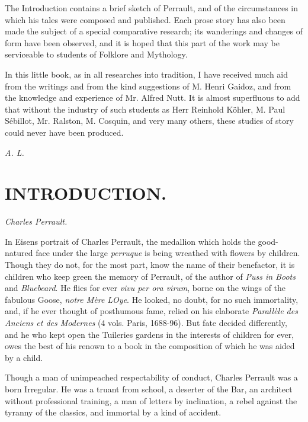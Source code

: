 \documentclass[14pt,a4paper]{memoir}
\begin{document}
The Introduction contains a brief sketch of Perrault, and
of the circumstances in which his tales were composed and published.
Each prose story has also been made the subject of a special comparative
research; its wanderings and changes of form have been observed, and it
is hoped that this part of the work may be serviceable to students of Folklore and Mythology.

In this little book, as in all researches into tradition, I have
received much aid from the writings and from the kind suggestions of M.
Henri Gaidoz, and from the knowledge and experience of Mr. Alfred
Nutt. It is almost superfluous to add that without the industry of
such students as Herr Reinhold Köhler, M. Paul Sébillot, Mr. Ralston,
M. Cosquin, and very many others, these studies of story could
never have been produced. \\

\begin{flushright}
\itshape A. L.
\end{flushright}


\chapter{INTRODUCTION.}

\begin{flushright}
\large \itshape Charles Perrault.
\end{flushright}

In Eisen\textquotesingle s portrait of Charles Perrault, the medallion
which holds the good-natured face under the large \emph{perruque} is
being wreathed with flowers by children. Though they do not, for the
most part, know the name of their benefactor, it is children who keep
green the memory of Perrault, of the author of \emph{Puss in Boots} and
\emph{Bluebeard}. He flies for ever \emph{vivu\textquotesingle{} per ora
virum}, borne on the wings of the fabulous Goose, \emph{notre Mère
L\textquotesingle Oye}. He looked, no doubt, for no such immortality,
and, if he ever thought of posthumous fame, relied on his elaborate
\emph{Parallèle des Anciens et des Modernes} (4 vols. Paris, 1688-96).
But fate decided differently, and he who kept open the Tuileries gardens
in the interests of children for ever, owes the best of his renown to a
book in the composition of which he was aided by a child.

Though a man of unimpeached respectability of conduct, Charles Perrault
was a born Irregular. He was a truant from school, a deserter of the
Bar, an architect without professional training, a man of letters by
inclination, a rebel against the tyranny of the classics, and immortal
by a kind of accident.
\end{document}

